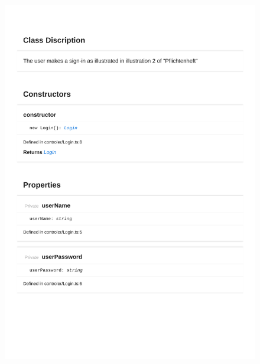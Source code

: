 \begin{figure}[H]
\centerline{\includegraphics[width=\textwidth]{FrontendDocsAsPDF/Model/Login.pdf}}
\end{figure}

